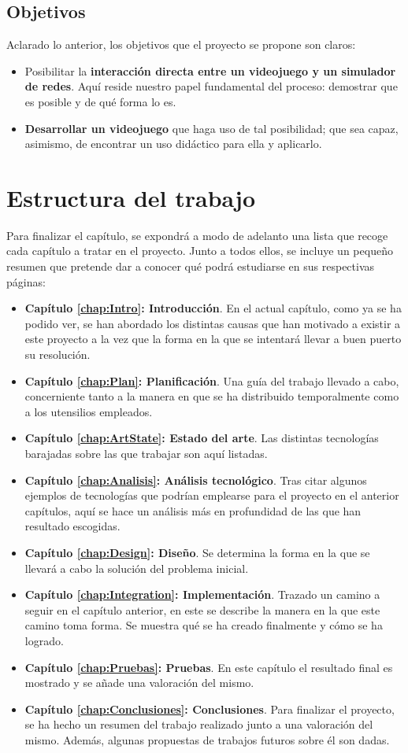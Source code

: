 \subsection{Objetivos}
Aclarado lo anterior, los objetivos que el proyecto se propone son claros:
\begin{itemize}
\item Posibilitar la \textbf{interacción directa entre un videojuego y un simulador de redes}. Aquí reside nuestro papel fundamental del proceso: demostrar que es posible y de qué forma lo es.
\item \textbf{Desarrollar un videojuego} que haga uso de tal posibilidad; que sea capaz, asimismo, de encontrar un uso didáctico para ella y aplicarlo.
\end{itemize}

\section{Estructura del trabajo}
Para finalizar el capítulo, se expondrá a modo de adelanto una lista que recoge cada capítulo a tratar en el proyecto. Junto a todos ellos, se incluye un pequeño resumen que pretende dar a conocer qué podrá estudiarse en sus respectivas páginas:
\begin{itemize}
\item \textbf{Capítulo \ref{chap:Intro}: Introducción}. En el actual capítulo, como ya se ha podido ver, se han abordado los distintas causas que han motivado a existir a este proyecto a la vez que la forma en la que se intentará llevar a buen puerto su resolución.
\item \textbf{Capítulo \ref{chap:Plan}: Planificación}. Una guía del trabajo llevado a cabo, concerniente tanto a la manera en que se ha distribuido temporalmente como a los utensilios empleados.
\item \textbf{Capítulo \ref{chap:ArtState}: Estado del arte}. Las distintas tecnologías barajadas sobre las que trabajar son aquí listadas.
\item \textbf{Capítulo \ref{chap:Analisis}: Análisis tecnológico}. Tras citar algunos ejemplos de tecnologías que podrían emplearse para el proyecto en el anterior capítulos, aquí se hace un análisis más en profundidad de las que han resultado escogidas.
\item \textbf{Capítulo \ref{chap:Design}: Diseño}. Se determina la forma en la que se llevará a cabo la solución del problema inicial.
\item \textbf{Capítulo \ref{chap:Integration}: Implementación}. Trazado un camino a seguir en el capítulo anterior, en este se describe la manera en la que este camino toma forma. Se muestra qué se ha creado finalmente y cómo se ha logrado.
\item \textbf{Capítulo \ref{chap:Pruebas}: Pruebas}. En este capítulo el resultado final es mostrado y se añade una valoración del mismo.
\item \textbf{Capítulo \ref{chap:Conclusiones}: Conclusiones}. Para finalizar el proyecto, se ha hecho un resumen del trabajo realizado junto a una valoración del mismo. Además, algunas propuestas de trabajos futuros sobre él son dadas.
\end{itemize}
